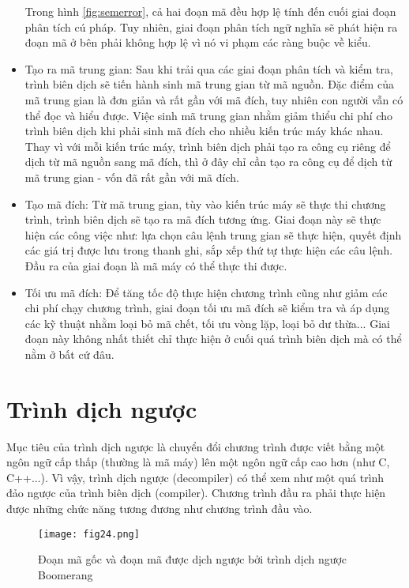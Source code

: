 \begin{itemize}
	Trong hình \ref{fig:semerror}, cả hai đoạn mã đều hợp lệ tính đến cuối giai đoạn phân tích cú pháp. Tuy nhiên, giai đoạn phân tích ngữ nghĩa sẽ phát hiện ra đoạn mã ở bên phải không hợp lệ vì nó vi phạm các ràng buộc về kiểu.
	
	\item Tạo ra mã trung gian: Sau khi trải qua các giai đoạn phân tích và kiểm tra, trình biên dịch sẽ tiến hành sinh mã trung gian từ mã nguồn. Đặc điểm của mã trung gian là đơn giản và rất gần với mã đích, tuy nhiên con người vẫn có thể đọc và hiểu được. Việc sinh mã trung gian nhằm giảm thiểu chi phí cho trình biên dịch khi phải sinh mã đích cho nhiều kiến trúc máy khác nhau. Thay vì với mỗi kiến trúc máy, trình biên dịch phải tạo ra công cụ riêng để dịch từ mã nguồn sang mã đích, thì ở đây chỉ cần tạo ra công cụ để dịch từ mã trung gian - vốn đã rất gần với mã đích.\\
	
	
	\item Tạo mã đích: Từ mã trung gian, tùy vào kiến trúc máy sẽ thực thi chương trình, trình biên dịch sẽ tạo ra mã đích tương ứng. Giai đoạn này sẽ thực hiện các công việc như: lựa chọn câu lệnh trung gian sẽ thực hiện, quyết định các giá trị được lưu trong thanh ghi, sắp xếp thứ tự thực hiện các câu lệnh. Đầu ra của giai đoạn là mã máy có thể thực thi được.
	
	
	\item Tối ưu mã đích: Để tăng tốc độ thực hiện chương trình cũng như giảm các chi phí chạy chương trình, giai đoạn tối ưu mã đích sẽ kiểm tra và áp dụng các kỹ thuật nhằm loại bỏ mã chết, tối ưu vòng lặp, loại bỏ dư thừa... Giai đoạn này không nhất thiết chỉ thực hiện ở cuối quá trình biên dịch mà có thể nằm ở bất cứ đâu.
\end{itemize}

\section{Trình dịch ngược}
Mục tiêu của trình dịch ngược là chuyển đổi chương trình được viết bằng một ngôn ngữ cấp thấp (thường là mã máy) lên một ngôn ngữ cấp cao hơn (như C, C++...). Vì vậy, trình dịch ngược (decompiler) có thể xem như một quá trình đảo ngược của trình biên dịch (compiler). Chương trình đầu ra phải thực hiện được những chức năng tương đương như chương trình đầu vào. \\

\begin{figure}[h]
	\centering
	\texttt{[image: fig24.png]}
	\caption{Đoạn mã gốc và đoạn mã được dịch ngược bởi trình dịch ngược Boomerang}
\end{figure}

